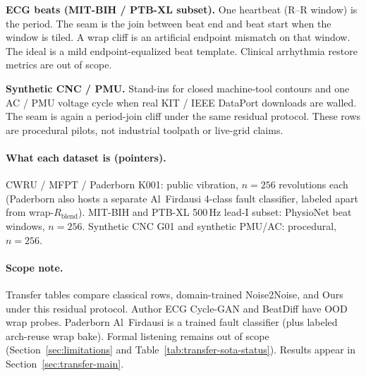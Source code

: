 \textbf{ECG beats (MIT-BIH / PTB-XL subset).}
One heartbeat (R--R window) is the period.
The seam is the join between beat end and beat start when the window is tiled.
A wrap cliff is an artificial endpoint mismatch on that window.
The ideal is a mild endpoint-equalized beat template.
Clinical arrhythmia restore metrics are out of scope.

\textbf{Synthetic CNC / PMU.}
Stand-ins for closed machine-tool contours and one AC / PMU voltage cycle when real KIT / IEEE DataPort downloads are walled.
The seam is again a period-join cliff under the same residual protocol.
These rows are procedural pilots, not industrial toolpath or live-grid claims.

\paragraph{What each dataset is (pointers).}
CWRU / MFPT / Paderborn K001: public vibration, $n{=}256$ revolutions each (Paderborn also hosts a separate Al~Firdausi 4-class fault classifier, labeled apart from wrap-$R_{\mathrm{blend}}$).
MIT-BIH and PTB-XL 500\,Hz lead-I subset: PhysioNet beat windows, $n{=}256$.
Synthetic CNC G01 and synthetic PMU/AC: procedural, $n{=}256$.

\paragraph{Scope note.}
Transfer tables compare classical rows, domain-trained Noise2Noise, and Ours under this residual protocol.
Author ECG Cycle-GAN and BeatDiff have OOD wrap probes.
Paderborn Al~Firdausi is a trained fault classifier (plus labeled arch-reuse wrap bake).
Formal listening remains out of scope
(Section~\ref{sec:limitations} and Table~\ref{tab:transfer-sota-status}).
Results appear in Section~\ref{sec:transfer-main}.
